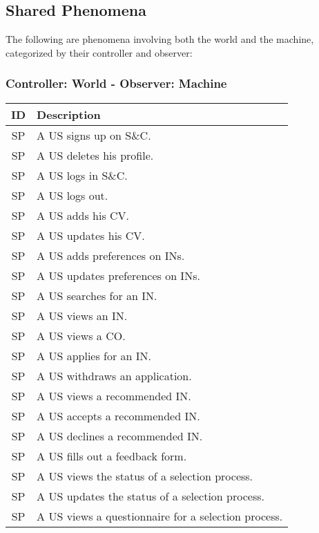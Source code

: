 \subsection{Shared Phenomena}
The following are phenomena involving both the world and the machine, categorized by their controller and observer:

\subsubsection{Controller: World - Observer: Machine}
\setcounter{sp}{1}
\newcommand{\spc}{\thesp\stepcounter{sp}}
\renewcommand{\arraystretch}{1.5}
\begin{longtable}{|c|p{10.5cm}|}
    \hline \rowcolor{polimiblue!40}
    \textbf{ID} & \textbf{Description} \\ \hline
    SP\spc & A US signs up on S\&C. \\ \hline
    SP\spc & A US deletes his profile.\\ \hline
    SP\spc & A US logs in S\&C. \\ \hline
    SP\spc & A US logs out. \\ \hline
    SP\spc & A US adds his CV. \\ \hline
    SP\spc & A US updates his CV. \\ \hline
    SP\spc & A US adds preferences on INs. \\ \hline
    SP\spc & A US updates preferences on INs. \\ \hline
    SP\spc & A US searches for an IN. \\ \hline
    SP\spc & A US views an IN. \\ \hline
    SP\spc & A US views a CO. \\ \hline
    SP\spc & A US applies for an IN. \\ \hline
    SP\spc & A US withdraws an application. \\ \hline
    SP\spc & A US views a recommended IN. \\ \hline
    SP\spc & A US accepts a recommended IN. \\ \hline
    SP\spc & A US declines a recommended IN. \\ \hline
    SP\spc & A US fills out a feedback form. \\ \hline
    SP\spc & A US views the status of a selection process. \\ \hline
    SP\spc & A US updates the status of a selection process. \\ \hline
    SP\spc & A US views a questionnaire for a selection process. \\ \hline

\end{longtable}

